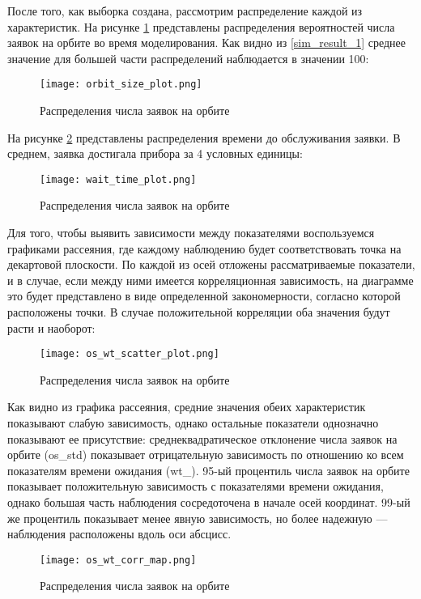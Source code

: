 После того, как выборка создана, рассмотрим распределение каждой из характеристик. На рисунке \ref{orbit_size_plot} представлены распределения вероятностей числа заявок на орбите во время моделирования. Как видно из \ref{sim_result_1} среднее значение для большей части распределений наблюдается в значении 100:

\begin{figure}[H]
	\centering
	\texttt{[image: orbit\_size\_plot.png]}
	\caption{Распределения числа заявок на орбите} 
	\label{orbit_size_plot}
\end{figure}

На рисунке \ref{wait_time_plot} представлены распределения времени до обслуживания заявки. В среднем, заявка достигала прибора за 4 условных единицы:

\begin{figure}[H]
	\centering
	\texttt{[image: wait\_time\_plot.png]}
	\caption{Распределения числа заявок на орбите} 
	\label{wait_time_plot}
\end{figure}

Для того, чтобы выявить зависимости между показателями воспользуемся графиками рассеяния, где каждому наблюдению будет соответствовать точка на декартовой плоскости. По каждой из осей отложены рассматриваемые показатели, и в случае, если между ними имеется корреляционная зависимость, на диаграмме это будет представлено в виде определенной закономерности, согласно которой расположены точки. В случае положительной корреляции оба значения будут расти и наоборот:
\begin{figure}[H]
	\centering
	\texttt{[image: os\_wt\_scatter\_plot.png]}
	\caption{Распределения числа заявок на орбите} 
	\label{os_wt_scatter_plot}
\end{figure}

Как видно из графика рассеяния, средние значения обеих характеристик показывают слабую зависимость, однако остальные показатели однозначно показывают ее присутствие: среднеквадратическое отклонение числа заявок на орбите (os\_std) показывает отрицательную зависимость по отношению ко всем показателям времени ожидания (wt\_). 95-ый процентиль числа заявок на орбите показывает положительную зависимость с показателями времени ожидания, однако большая часть наблюдения сосредоточена в начале осей координат. 99-ый же процентиль показывает менее явную зависимость, но более надежную --- наблюдения расположены вдоль оси абсцисс.

\begin{figure}[H]
	\centering
	\texttt{[image: os\_wt\_corr\_map.png]}
	\caption{Распределения числа заявок на орбите} 
	\label{os_wt_corr_map}
\end{figure}

